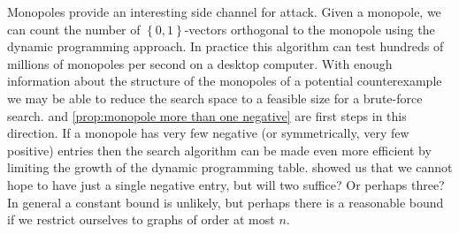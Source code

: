 Monopoles provide an interesting side channel for attack. Given a monopole, we can count the number of $\left\{0,1\right\}$-vectors orthogonal to the monopole using the dynamic programming approach. In practice this algorithm can test hundreds of millions of monopoles per second on a desktop computer. With enough information about the structure of the monopoles of a potential counterexample we may be able to reduce the search space to a feasible size for a brute-force search.  and \autoref{prop:monopole more than one negative} are first steps in this direction. If a monopole has very few negative (or symmetrically, very few positive) entries then the search algorithm can be made even more efficient by limiting the growth of the dynamic programming table.  showed us that we cannot hope to have just a single negative entry, but will two suffice? Or perhaps three? In general a constant bound is unlikely, but perhaps there is a reasonable bound if we restrict ourselves to graphs of order at most $n$.